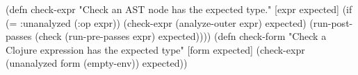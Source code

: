 \begin{cljlisting}
(defn check-expr
  "Check an AST node has the expected type."
  [expr expected]
  (if (= :unanalyzed (:op expr))
    (check-expr (analyze-outer expr) expected)
    (run-post-passes
      (check (run-pre-passes expr)
             expected))))
(defn check-form
  "Check a Clojure expression has the expected type"
  [form expected]
  (check-expr (unanalyzed form (empty-env))
              expected))
\end{cljlisting}



